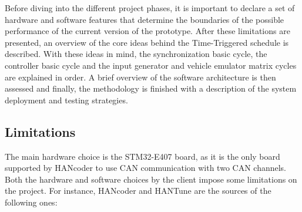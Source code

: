 \documentclass[table,xcdraw]{article}
\begin{document}
Before diving into the different project phases, it is important to declare a set of hardware and software features that determine the boundaries of the possible performance of the current version of the prototype. After these limitations are presented, an overview of the core ideas behind the Time-Triggered schedule is described. With these ideas in mind, the synchronization basic cycle, the controller basic cycle and the input generator and vehicle emulator matrix cycles are explained in order. A brief overview of the software architecture is then assessed and finally, the methodology is finished with a description of the system deployment and testing strategies.

\subsection{Limitations}
The main hardware choice is the STM32-E407 board, as it is the only board supported by HANcoder to use CAN communication with two CAN channels. Both the hardware and software choices by the client impose some limitations on the project. For instance, HANcoder and HANTune are the sources of the following ones:
\end{document}
